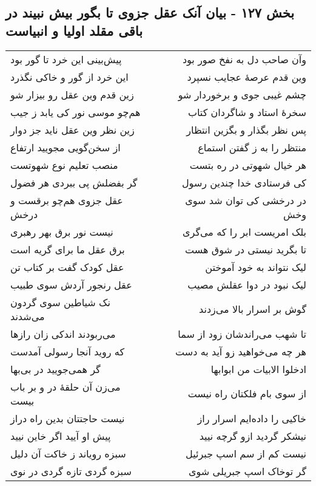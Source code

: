 \begin{center}
\section*{بخش ۱۲۷ - بیان آنک عقل جزوی تا بگور بیش نبیند در باقی مقلد اولیا  و انبیاست}
\label{sec:sh127}
\begin{longtable}{l p{0.5cm} r}
پیش‌بینی این خرد تا گور بود
&&
وآن صاحب دل به نفخ صور بود
\\
این خرد از گور و خاکی نگذرد
&&
وین قدم عرصهٔ عجایب نسپرد
\\
زین قدم وین عقل رو بیزار شو
&&
چشم غیبی جوی و برخوردار شو
\\
هم‌چو موسی نور کی یابد ز جیب
&&
سخرهٔ استاد و شاگردان کتاب
\\
زین نظر وین عقل ناید جز دوار
&&
پس نظر بگذار و بگزین انتظار
\\
از سخن‌گویی مجویید ارتفاع
&&
منتظر را به ز گفتن استماع
\\
منصب تعلیم نوع شهوتست
&&
هر خیال شهوتی در ره بتست
\\
گر بفضلش پی ببردی هر فضول
&&
کی فرستادی خدا چندین رسول
\\
عقل جزوی هم‌چو برقست و درخش
&&
در درخشی کی توان شد سوی وخش
\\
نیست نور برق بهر رهبری
&&
بلک امریست ابر را که می‌گری
\\
برق عقل ما برای گریه است
&&
تا بگرید نیستی در شوق هست
\\
عقل کودک گفت بر کتاب تن
&&
لیک نتواند به خود آموختن
\\
عقل رنجور آردش سوی طبیب
&&
لیک نبود در دوا عقلش مصیب
\\
نک شیاطین سوی گردون می‌شدند
&&
گوش بر اسرار بالا می‌زدند
\\
می‌ربودند اندکی زان رازها
&&
تا شهب می‌راندشان زود از سما
\\
که روید آنجا رسولی آمدست
&&
هر چه می‌خواهید زو آید به دست
\\
گر همی‌جویید در بی‌بها
&&
ادخلوا الابیات من ابوابها
\\
می‌زن آن حلقهٔ در و بر باب بیست
&&
از سوی بام فلکتان راه نیست
\\
نیست حاجتتان بدین راه دراز
&&
خاکیی را داده‌ایم اسرار راز
\\
پیش او آیید اگر خاین نیید
&&
نیشکر گردید ازو گرچه نیید
\\
سبزه رویاند ز خاکت آن دلیل
&&
نیست کم از سم اسپ جبرئیل
\\
سبزه گردی تازه گردی در نوی
&&
گر توخاک اسپ جبریلی شوی
\\

\end{longtable}
\end{center}
